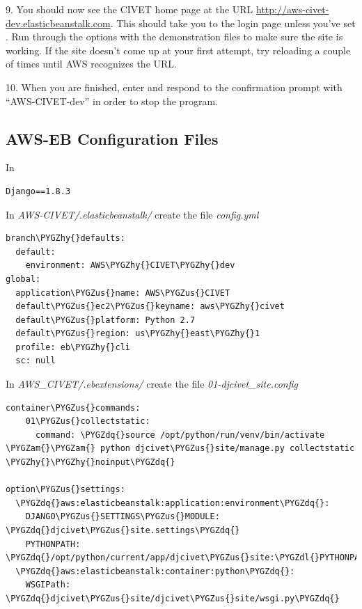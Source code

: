 \documentclass[letterpaper,10pt,english]{sphinxmanual}
\def\PYGZus{\char`\_}
\def\PYGZam{\char`\&}
\def\PYGZdl{\char`\$}
\def\PYGZhy{\char`\-}
\def\PYGZdq{\char`\"}
\begin{document}
9. You should now see the CIVET home page at the URL \href{http://aws-civet-dev.elasticbeanstalk.com}{http://aws-civet-dev.elasticbeanstalk.com}. This should take you to the
login page unless you've set . Run through the options with the demonstration files to make sure
the site is working. If the site doesn't come up at your first attempt, try reloading a couple of times until AWS
recognizes the URL.

10. When you are finished, enter  and respond to the confirmation prompt with “AWS-CIVET-dev” in order to
stop the program.


\subsection{AWS-EB Configuration Files}
\label{appendix5:aws-eb-configuration-files}
In

\begin{Verbatim}[commandchars=\\\{\}]
Django==1.8.3
\end{Verbatim}

In \emph{AWS-CIVET/.elasticbeanstalk/} create the file \emph{config.yml}

\begin{Verbatim}[commandchars=\\\{\}]
branch\PYGZhy{}defaults:
  default:
    environment: AWS\PYGZhy{}CIVET\PYGZhy{}dev
global:
  application\PYGZus{}name: AWS\PYGZus{}CIVET
  default\PYGZus{}ec2\PYGZus{}keyname: aws\PYGZhy{}civet
  default\PYGZus{}platform: Python 2.7
  default\PYGZus{}region: us\PYGZhy{}east\PYGZhy{}1
  profile: eb\PYGZhy{}cli
  sc: null
\end{Verbatim}

In \emph{AWS\_CIVET/.ebextensions/} create the file \emph{01-djcivet\_site.config}

\begin{Verbatim}[commandchars=\\\{\}]
container\PYGZus{}commands:
    01\PYGZus{}collectstatic:
      command: \PYGZdq{}source /opt/python/run/venv/bin/activate \PYGZam{}\PYGZam{} python djcivet\PYGZus{}site/manage.py collectstatic \PYGZhy{}\PYGZhy{}noinput\PYGZdq{}

option\PYGZus{}settings:
  \PYGZdq{}aws:elasticbeanstalk:application:environment\PYGZdq{}:
    DJANGO\PYGZus{}SETTINGS\PYGZus{}MODULE: \PYGZdq{}djcivet\PYGZus{}site.settings\PYGZdq{}
    PYTHONPATH: \PYGZdq{}/opt/python/current/app/djcivet\PYGZus{}site:\PYGZdl{}PYTHONPATH\PYGZdq{}
  \PYGZdq{}aws:elasticbeanstalk:container:python\PYGZdq{}:
    WSGIPath: \PYGZdq{}djcivet\PYGZus{}site/djcivet\PYGZus{}site/wsgi.py\PYGZdq{}
\end{Verbatim}
\end{document}
